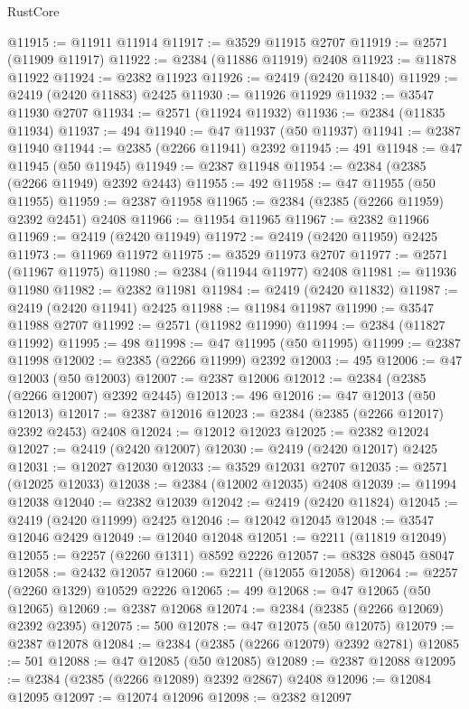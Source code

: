 \begin{lexlean}{RustCore}
\begin{coremodule}
@11915 := @11911 @11914
@11917 := @3529 @11915 @2707
@11919 := @2571 (@11909 @11917)
@11922 := @2384 (@11886 @11919) @2408
@11923 := @11878 @11922
@11924 := @2382 @11923
@11926 := @2419 (@2420 @11840)
@11929 := @2419 (@2420 @11883) @2425
@11930 := @11926 @11929
@11932 := @3547 @11930 @2707
@11934 := @2571 (@11924 @11932)
@11936 := @2384 (@11835 @11934)
@11937 := 494
@11940 := @47 @11937 (@50 @11937)
@11941 := @2387 @11940
@11944 := @2385 (@2266 @11941) @2392
@11945 := 491
@11948 := @47 @11945 (@50 @11945)
@11949 := @2387 @11948
@11954 := @2384 (@2385 (@2266 @11949) @2392 @2443)
@11955 := 492
@11958 := @47 @11955 (@50 @11955)
@11959 := @2387 @11958
@11965 := @2384 (@2385 (@2266 @11959) @2392 @2451) @2408
@11966 := @11954 @11965
@11967 := @2382 @11966
@11969 := @2419 (@2420 @11949)
@11972 := @2419 (@2420 @11959) @2425
@11973 := @11969 @11972
@11975 := @3529 @11973 @2707
@11977 := @2571 (@11967 @11975)
@11980 := @2384 (@11944 @11977) @2408
@11981 := @11936 @11980
@11982 := @2382 @11981
@11984 := @2419 (@2420 @11832)
@11987 := @2419 (@2420 @11941) @2425
@11988 := @11984 @11987
@11990 := @3547 @11988 @2707
@11992 := @2571 (@11982 @11990)
@11994 := @2384 (@11827 @11992)
@11995 := 498
@11998 := @47 @11995 (@50 @11995)
@11999 := @2387 @11998
@12002 := @2385 (@2266 @11999) @2392
@12003 := 495
@12006 := @47 @12003 (@50 @12003)
@12007 := @2387 @12006
@12012 := @2384 (@2385 (@2266 @12007) @2392 @2445)
@12013 := 496
@12016 := @47 @12013 (@50 @12013)
@12017 := @2387 @12016
@12023 := @2384 (@2385 (@2266 @12017) @2392 @2453) @2408
@12024 := @12012 @12023
@12025 := @2382 @12024
@12027 := @2419 (@2420 @12007)
@12030 := @2419 (@2420 @12017) @2425
@12031 := @12027 @12030
@12033 := @3529 @12031 @2707
@12035 := @2571 (@12025 @12033)
@12038 := @2384 (@12002 @12035) @2408
@12039 := @11994 @12038
@12040 := @2382 @12039
@12042 := @2419 (@2420 @11824)
@12045 := @2419 (@2420 @11999) @2425
@12046 := @12042 @12045
@12048 := @3547 @12046 @2429
@12049 := @12040 @12048
@12051 := @2211 (@11819 @12049)
@12055 := @2257 (@2260 @1311) @8592 @2226
@12057 := @8328 @8045 @8047
@12058 := @2432 @12057
@12060 := @2211 (@12055 @12058)
@12064 := @2257 (@2260 @1329) @10529 @2226
@12065 := 499
@12068 := @47 @12065 (@50 @12065)
@12069 := @2387 @12068
@12074 := @2384 (@2385 (@2266 @12069) @2392 @2395)
@12075 := 500
@12078 := @47 @12075 (@50 @12075)
@12079 := @2387 @12078
@12084 := @2384 (@2385 (@2266 @12079) @2392 @2781)
@12085 := 501
@12088 := @47 @12085 (@50 @12085)
@12089 := @2387 @12088
@12095 := @2384 (@2385 (@2266 @12089) @2392 @2867) @2408
@12096 := @12084 @12095
@12097 := @12074 @12096
@12098 := @2382 @12097

\end{coremodule}
\end{lexlean}
